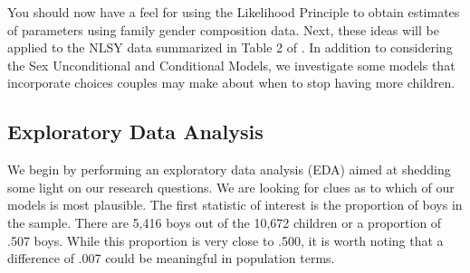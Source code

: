 \documentclass[
]{krantz}
\begin{document}
You should now have a feel for using the Likelihood Principle to obtain estimates of parameters using family gender composition data. Next, these ideas will be applied to the NLSY data summarized in Table 2 of \citep{Rodgers2001}. In addition to considering the Sex Unconditional and Conditional Models, we investigate some models that incorporate choices couples may make about when to stop having more children.

\subsection{Exploratory Data Analysis}\label{EDA.sec}

We begin by performing an exploratory data analysis (EDA) aimed at shedding some light on our research questions. We are looking for clues as to which of our models is most plausible. The first statistic of interest is the proportion of boys in the sample. There are 5,416 boys out of the 10,672 children or a proportion of .507 boys. While this proportion is very close to .500, it is worth noting that a difference of .007 could be meaningful in population terms.

\begin{table}
\centering
\caption{\label{tab:table4chp2}Number of families and children in families with given composition in NLSY data. Sex ratio and proportion males are given by family size.}
\centering
{}
\end{table}
\end{document}
